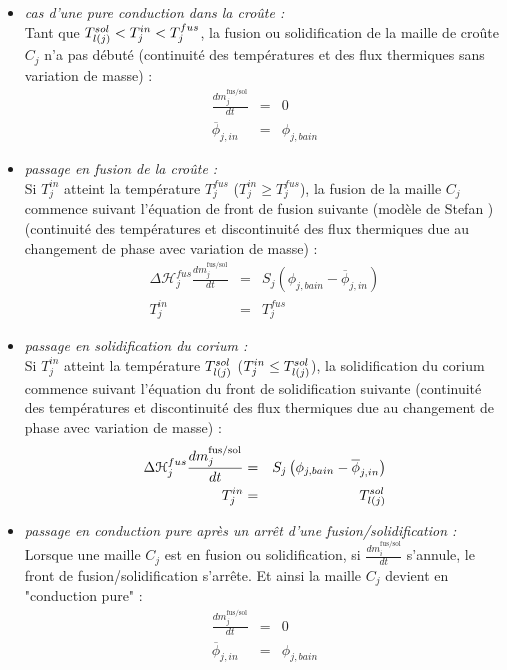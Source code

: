 \begin{itemize}
\item {\it cas d'une pure conduction dans la croûte :}\\
Tant que $\temperature[sol]{l(j)}<T_j^{in}<T_j^{fus}$, la fusion ou solidification de la maille de croûte $C_j$ n'a pas débuté (continuité des températures et des flux thermiques sans variation de masse) :
\begin{eqnarray*}
\frac{dm_j^\text{fus/sol}}{dt} &=& 0 \\
\overline{\phi}_{j,in} &=& \phi_{j,bain}
\end{eqnarray*}

\item {\it passage en fusion de la croûte :}\\
Si $T_j^{in}$ atteint la température $T_j^{fus}$ ($T_j^{in}\ge T_j^{fus}$), la fusion de la maille $C_j$ commence suivant l'équation de front de fusion suivante (modèle de Stefan \cite{LeTellier2016}) (continuité des températures et discontinuité des flux thermiques due au changement de phase avec variation de masse) :
\begin{eqnarray*}
\Delta \mathcal{H}_j^{fus} \frac{dm_j^\text{fus/sol}}{dt} &=& S_j\left(\phi_{j,bain} - \overline{\phi}_{j,in}\right) \\
T_j^{in} &=& T_j^{fus}
\end{eqnarray*}

\item {\it passage en solidification du corium :}\\
Si $T_j^{in}$ atteint la température $\temperature[sol]{l(j)}$ ($T_j^{in}\le \temperature[sol]{l(j)}$), la solidification du corium commence suivant l'équation du front de solidification suivante (continuité des températures et discontinuité des flux thermiques due au changement de phase avec variation de masse) :
\begin{eqnarray*}
\Delta \mathcal{H}_j^{fus} \frac{dm_j^\text{fus/sol}}{dt} &=& S_j\left(\phi_{j,bain} - \overline{\phi}_{j,in}\right) \\
T_j^{in} &=& \temperature[sol]{l(j)}
\end{eqnarray*}

\item {\it passage en conduction pure après un arrêt d'une fusion/solidification :}\\
Lorsque une maille $C_j$ est en fusion ou solidification, si $\frac{dm_i^\text{fus/sol}}{dt}$ s'annule, le front de fusion/solidification s'arrête. Et ainsi la maille $C_j$ devient en "conduction pure" :
\begin{eqnarray*}
\frac{dm_j^\text{fus/sol}}{dt} &=& 0 \\
\overline{\phi}_{j,in} &=& \phi_{j,bain}
\end{eqnarray*}
\end{itemize}

